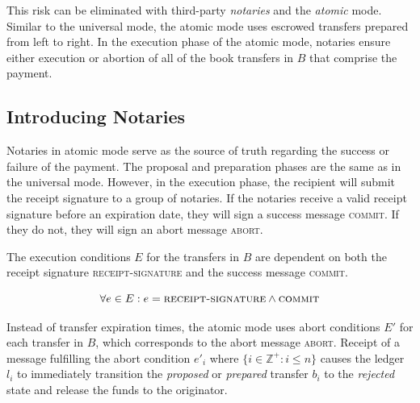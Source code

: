 \documentclass[letterpaper,twocolumn,10pt]{article}
\begin{document}
This risk can be eliminated with third-party \textit{notaries} and the \textit{atomic} mode. Similar to the universal mode, the atomic mode uses escrowed transfers prepared from left to right. In the execution phase of the atomic mode, notaries ensure either execution or abortion of all of the book transfers in $B$ that comprise the payment.




\subsection{Introducing Notaries}


Notaries in atomic mode serve as the source of truth regarding the success or failure of the payment. The proposal and preparation phases are the same as in the universal mode. However, in the execution phase, the recipient will submit the receipt signature to a group of notaries. If the notaries receive a valid receipt signature before an expiration date, they will sign a success message \textsc{commit}. If they do not, they will sign an abort message \textsc{abort}.

The execution conditions $E$ for the transfers in $B$ are dependent on both the receipt signature \textsc{receipt-signature} and the success message \textsc{commit}.

\begin{equation}
\forall e \in E : e = \textsc{receipt-signature} \land \textsc{commit}
\end{equation}

Instead of transfer expiration times, the atomic mode uses abort conditions $E'$ for each transfer in $B$, which corresponds to the abort message \textsc{abort}. Receipt of a message fulfilling the abort condition $e'_i$ where $\{ i \in \mathbb{Z}^+ : i \leq n \}$ causes the ledger $l_i$ to immediately transition the \textit{proposed} or \textit{prepared} transfer $b_i$ to the \textit{rejected} state and release the funds to the originator.
\end{document}
